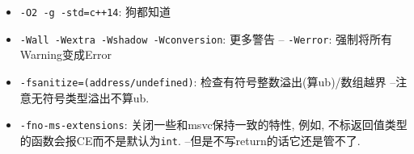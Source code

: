 \begin{itemize}
	\item \texttt{-O2 -g -std=c++14}: 狗都知道
	\item \texttt{-Wall -Wextra -Wshadow -Wconversion}: 更多警告
		\subitem --\; \texttt{-Werror}: 强制将所有Warning变成Error
	\item \texttt{-fsanitize=(address/undefined)}: 检查有符号整数溢出(算ub)/数组越界
		\subitem --\;注意无符号类型溢出不算ub.
	\item \texttt{-fno-ms-extensions}: 关闭一些和msvc保持一致的特性, 例如, 不标返回值类型的函数会报CE而不是默认为\texttt{int}.
		\subitem --\;但是不写return的话它还是管不了.
\end{itemize}